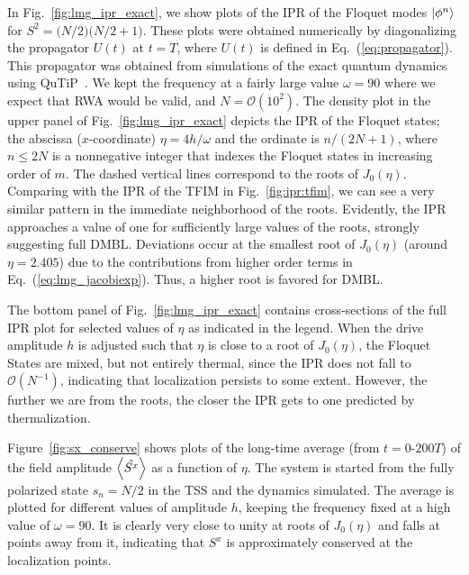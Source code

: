 \documentclass[%
reprint,
superscriptaddress,
amsmath,amssymb,
aps,
prb,
showkeys,
]{revtex4-2}
\begin{document}
In Fig.~\ref{fig:lmg_ipr_exact}, we show plots of the IPR of the Floquet modes $\ket{\phi^n}$ for $S^2 = \big(N/2\big)\big(N/2 + 1\big)$.
These plots were obtained numerically by diagonalizing the propagator $U(t)$ at $t=T$, where $U(t)$ is defined in Eq.~(\ref{eq:propagator}). This propagator was obtained from simulations of the exact quantum dynamics using QuTiP~\cite{qutip}. We kept the frequency at a fairly large value $\omega = 90$ where we expect that RWA would be valid, and $N=\mathcal{O}(10^2)$. The density plot in the upper panel of Fig.~\ref{fig:lmg_ipr_exact} depicts the IPR of the Floquet states; the abscissa ($x$-coordinate)  $\eta=4h/\omega$ and the ordinate is $n/(2N+1)$, where $n\leq 2N$ is a nonnegative integer that indexes the Floquet states in increasing order of $m$. The dashed vertical lines correspond to the roots of $J_0(\eta)$. Comparing with the IPR of the TFIM in Fig.~\ref{fig:ipr:tfim}, we can see a very similar pattern in the immediate neighborhood of the roots. Evidently, the IPR approaches a value of one for sufficiently large values of the roots, strongly suggesting full DMBL. Deviations occur at the smallest root of $J_0(\eta)$ (around $\eta = 2.405$) due to the contributions from higher order terms in Eq.~(\ref{eq:lmg_jacobiexp}). Thus, a higher root is favored for DMBL.

The bottom panel of Fig.~\ref{fig:lmg_ipr_exact} contains cross-sections of the full IPR plot for selected values of $\eta$ as indicated in the legend. When the drive amplitude $h$ is adjusted such that $\eta$ is close to a root of $J_0(\eta)$, the Floquet States are mixed, but not entirely thermal, since the IPR does not fall to $\mathcal{O}(N^{-1})$, indicating that localization persists to some extent. However, the further we are from the roots, the closer the IPR gets to one predicted by thermalization.

Figure~\ref{fig:sx_conserve} shows plots of the long-time average (from $t=0$-$200T$) of the field amplitude $\expval{\hat{S^x}}$ as a function of $\eta$. The system is started from the fully polarized state $s_n=N/2$ in the TSS and the dynamics simulated. The average is plotted for different values of amplitude $h$, keeping the frequency fixed at a high value of $\omega=90$. It is clearly very close to unity at roots of $J_0(\eta)$ and falls at points away from it, indicating that $S^x$ is approximately conserved at the localization points.
\end{document}
